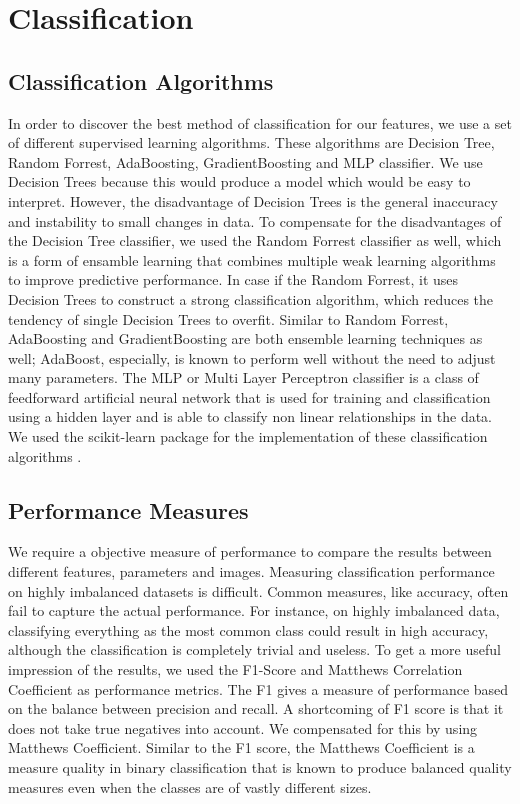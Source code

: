 \section{Classification}


\subsection{Classification Algorithms}
In order to discover the best method of classification for our features, we use a set of different supervised learning algorithms. These algorithms are Decision Tree, Random Forrest, AdaBoosting, GradientBoosting and MLP classifier. We use Decision Trees because this would produce a model which would be easy to interpret. However, the disadvantage of Decision Trees is the general inaccuracy and instability to small changes in data. To compensate for the disadvantages of the Decision Tree classifier, we used the Random Forrest classifier as well, which is a form of ensamble learning that combines multiple weak learning algorithms to improve predictive performance. In case if the Random Forrest, it uses Decision Trees to construct a strong classification algorithm, which reduces the tendency of single Decision Trees to overfit. Similar to Random Forrest, AdaBoosting and GradientBoosting are both ensemble learning techniques as well; AdaBoost, especially, is known to perform well without the need to adjust many parameters. The MLP  or Multi Layer Perceptron classifier is a class of feedforward artificial neural network that is used for training and classification using a hidden layer and is able to classify non linear relationships in the data. We used the scikit-learn package for the implementation of these classification algorithms \cite{scikit-learn}.

\subsection{Performance Measures}
We require a objective measure of performance to compare the results between different features, parameters and images. Measuring classification performance on highly imbalanced datasets is difficult. Common measures, like accuracy, often fail to capture the actual performance. For instance, on highly imbalanced data, classifying everything as the most common class could result in high accuracy, although the classification is completely trivial and useless. To get a more useful impression of the results, we used the F1-Score and Matthews Correlation Coefficient as performance metrics. The F1 gives a measure of performance based on the balance between precision and recall. A shortcoming of F1 score is that it does not take true negatives into account. We compensated for this by using Matthews Coefficient. Similar to the F1 score, the Matthews Coefficient is a measure quality in binary classification that is known to produce balanced quality measures even when the classes are of vastly different sizes.

